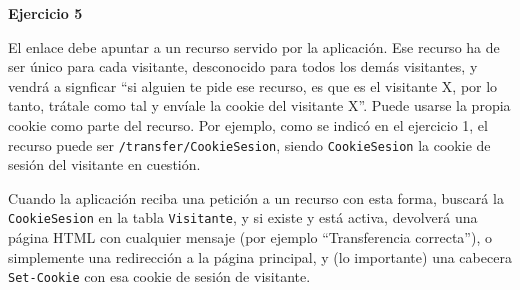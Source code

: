 \textbf{Ejercicio 5}

El enlace debe apuntar a un recurso servido por la aplicación. Ese recurso ha de ser único para cada visitante, desconocido para todos los demás visitantes, y vendrá a signficar ``si alguien te pide ese recurso, es que es el visitante X, por lo tanto, trátale como tal y envíale la cookie del visitante X''. Puede usarse la propia cookie como parte del recurso. Por ejemplo, como se indicó en el ejercicio 1, el recurso puede ser \texttt{/transfer/CookieSesion}, siendo \texttt{CookieSesion} la cookie de sesión del visitante en cuestión.

Cuando la aplicación reciba una petición a un recurso con esta forma, buscará la \texttt{CookieSesion} en la tabla \texttt{Visitante}, y si existe y está activa, devolverá una página HTML con cualquier mensaje (por ejemplo ``Transferencia correcta''), o simplemente una redirección a la página principal, y (lo importante) una cabecera \texttt{Set-Cookie} con esa cookie de sesión de visitante.

